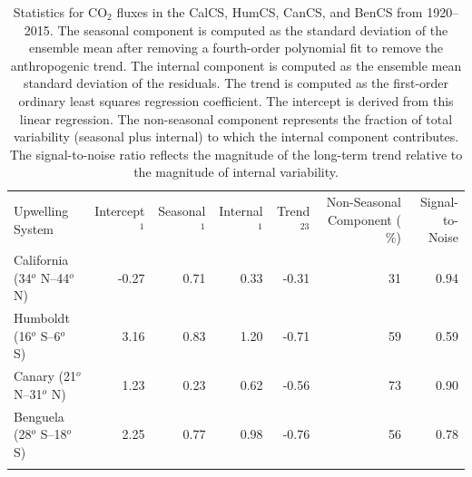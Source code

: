 \documentclass[hvmath, online,bgd]{copernicus_discussions}
\begin{document}
\clearpage
\begin{table}[t]
\caption{Statistics for CO$_{2}$ fluxes in the CalCS, HumCS, CanCS, and BenCS from 1920--2015. The seasonal component is computed as the standard deviation of the ensemble mean after removing a fourth-order polynomial fit to remove the anthropogenic trend. The internal component is computed as the ensemble mean standard deviation of the residuals. The trend is computed as the first-order ordinary least squares regression coefficient. The intercept is derived from this linear regression. The non-seasonal component represents the fraction of total variability (seasonal plus internal) to which the internal component contributes. The signal-to-noise ratio reflects the magnitude of the long-term trend relative to the magnitude of internal variability.}
\begin{adjustbox}{width=1\textwidth}
\begin{tabular}{l r r r r r r}
\tophline
Upwelling System & Intercept$^{1}$ & Seasonal$^{1}$ & Internal$^{1}$ & Trend$^{23}$ & Non-Seasonal Component ($\%$) & Signal-to-Noise \\
\middlehline
California (34$^{o}$ N--44$^{o}$ N) & -0.27 & 0.71 & 0.33 & -0.31 &  31 & 0.94 \\
Humboldt (16$^{o}$ S--6$^{o}$ S)  & 3.16 & 0.83 & 1.20 & -0.71 & 59 & 0.59 \\
Canary (21$^{o}$ N--31$^{o}$ N) & 1.23 & 0.23 & 0.62 & -0.56 & 73 & 0.90 \\
Benguela (28$^{o}$ S--18$^{o}$ S) & 2.25 & 0.77 & 0.98 & -0.76 & 56 & 0.78 \\
\bottomhline
\end{tabular}
\end{adjustbox}
\label{Table:1}
\end{table}
\end{document}
